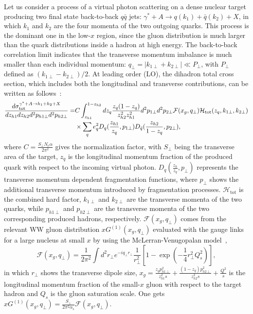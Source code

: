 Let us consider a process of a virtual photon scattering on a dense nuclear target
producing two final state back-to-back $q\bar q$ jets:
$\gamma^{*}+A\rightarrow q(k_{1})+\bar{q}(k_{2})+X$, in which $k_1$ and $k_2$ are
the four momenta of the two outgoing quarks. This process is the
dominant one in the low-$x$ region, since the gluon distribution is much larger than
the quark distributions inside a hadron at high energy. The back-to-back correlation
limit indicates that the transverse momentum imbalance is much smaller than each
individual momentum: $q_{\perp}=|k_{1\perp}+k_{2\perp}|\ll P_{\perp}$, with
$P_{\perp}$ defined as $(k_{1\perp}-k_{2\perp})/2$. At leading order (LO), the
dihadron total cross section, which includes both the longitudinal and
transverse contributions, can be written as follows~\cite{Dominguez:2011wm}:
\begin{eqnarray} \label{eqn:xspairCGC}
\frac{d\sigma^{\gamma^{*}+A\rightarrow h_{1}+h_{2}+X}_{\textrm{tot}}}{dz_{h1}dz_{h2}d^{2}p_{h1\perp}d^{2}p_{h2\perp}} = & C\int^{1-z_{h2}}_{z_{h1}} dz_{q}
\frac{z_{q}(1-z_{q})}{z^{2}_{h2}z^{2}_{h1}}
d^{2}p_{1\perp}d^{2}p_{2\perp}\mathcal{F}(x_{g},q_{\perp})
\mathcal{H}_{\textrm{tot}}(z_{q},k_{1\perp},k_{2\perp})  \nonumber \\
& \times \sum_{q}e^{2}_{q}D_{q}(\frac{z_{h1}}{z_{q}},p_{1\perp})
D_{\bar{q}}(\frac{z_{h2}}{1-z_{q}},p_{2\perp}),
\end{eqnarray}
where $C=\frac{S_{\perp}N_{c}\alpha}{2\pi^{2}}$ gives the normalization
factor, with $S_{\perp}$ being the transverse area of the target, $z_{q}$ is the
longitudinal momentum fraction of the produced quark with respect to the incoming
virtual photon. $D_{q}(\frac{z_{h}}{z_{q}},p_{\perp})$ represents the transverse 
momentum dependent fragmentation functions, where $p_{\perp}$ shows the additional transverse
momentum introduced by fragmentation processes. $\mathcal{H}_{\textrm{tot}}$ is the combined hard factor,
$k_{1\perp}$ and $k_{2\perp}$ are the transverse momenta of the two quarks, while
$p_{h1\perp}$ and $p_{h2\perp}$ are the transverse momenta of the two corresponding
produced hadrons, respectively. $\mathcal{F}(x_{g},q_{\perp})$ comes from the
relevant WW gluon distribution $xG^{(1)}(x_g,q_\perp)$ evaluated with the gauge
links for a large nucleus at small $x$ by using the McLerran-Venugopalan
model~\cite{McLerran:1993ni},
\begin{equation} 
\mathcal{F}(x_{g}, q_{\perp}) =
\frac{1}{2\pi^{2}} \int d^{2}r_{\perp} e^{-iq_{\perp}r_{\perp}}
\frac{1}{r^{2}_{\perp}}[1-\exp(-\frac{1}{4}r^{2}_{\perp}Q^{2}_{s})],
\end{equation}
in which $r_{\perp}$ shows the transverse dipole size,  $x_{g}=\frac{z_{q}p_{h1\perp}^2}{z_{h1}^2s}+\frac{(1-z_{q})p_{h2\perp}^2}{z_{h2}^2s}+\frac{Q^2}{s}$ 
is the longitudinal momentum fraction of the small-$x$ gluon with respect to the target hadron and 
$Q_{s}$ is the gluon saturation scale. One gets $xG^{(1)}(x_{g},q_{\perp})=\frac{S_{\perp}}{2\pi^{2}\alpha_{s}}\mathcal{F}(x_{g}, q_{\perp})$.

